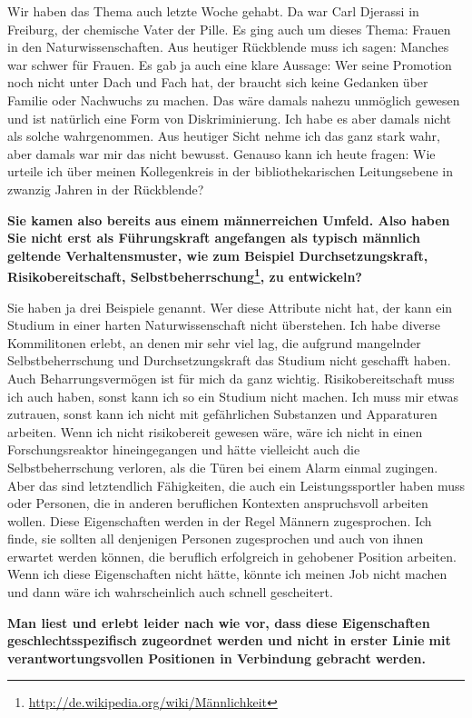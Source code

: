 \documentclass[a4paper,
fontsize=11pt,
oneside,
numbers=noperiodatend,
parskip=half-,
bibliography=totoc,
final
]{scrartcl}
\begin{document}
Wir haben das Thema auch letzte Woche gehabt. Da war Carl Djerassi in
Freiburg, der chemische Vater der Pille. Es ging auch um dieses Thema:
Frauen in den Naturwissenschaften. Aus heutiger Rückblende muss ich
sagen: Manches war schwer für Frauen. Es gab ja auch eine klare Aussage:
Wer seine Promotion noch nicht unter Dach und Fach hat, der braucht sich
keine Gedanken über Familie oder Nachwuchs zu machen. Das wäre damals
nahezu unmöglich gewesen und ist natürlich eine Form von
Diskriminierung. Ich habe es aber damals nicht als solche wahrgenommen.
Aus heutiger Sicht nehme ich das ganz stark wahr, aber damals war mir
das nicht bewusst. Genauso kann ich heute fragen: Wie urteile ich über
meinen Kollegenkreis in der bibliothekarischen Leitungsebene in zwanzig
Jahren in der Rückblende?

\textbf{Sie kamen also bereits aus einem männerreichen Umfeld. Also
haben Sie nicht erst als Füh\-rungs\-kraft angefangen als typisch männlich
geltende Verhaltensmuster, wie zum Beispiel Durchsetzungskraft,
Risikobereitschaft, Selbstbeherrschung\footnote{\href{http://de.wikipedia.org/wiki/M\%C3\%A4nnlichkeit}{http://de.wikipedia.org/wiki/Männlichkeit}},
zu entwickeln?}

Sie haben ja drei Beispiele genannt. Wer diese Attribute nicht hat, der
kann ein Studium in einer harten Naturwissenschaft nicht überstehen. Ich
habe diverse Kommilitonen erlebt, an denen mir sehr viel lag, die
aufgrund mangelnder Selbstbeherrschung und Durchsetzungskraft das
Studium nicht geschafft haben. Auch Beharrungsvermögen ist für mich da
ganz wichtig. Risikobereitschaft muss ich auch haben, sonst kann ich so
ein Studium nicht machen. Ich muss mir etwas zutrauen, sonst kann ich
nicht mit gefährlichen Substanzen und Apparaturen arbeiten. Wenn ich
nicht risikobereit gewesen wäre, wäre ich nicht in einen
Forschungsreaktor hineingegangen und hätte vielleicht auch die
Selbstbeherrschung verloren, als die Türen bei einem Alarm einmal
zugingen. Aber das sind letztendlich Fähigkeiten, die auch ein
Leistungssportler haben muss oder Personen, die in anderen beruflichen
Kontexten anspruchsvoll arbeiten wollen. Diese Eigenschaften werden in
der Regel Männern zugesprochen. Ich finde, sie sollten all denjenigen
Personen zugesprochen und auch von ihnen erwartet werden können, die
beruflich erfolgreich in gehobener Position arbeiten. Wenn ich diese
Eigenschaften nicht hätte, könnte ich meinen Job nicht machen und dann
wäre ich wahrscheinlich auch schnell gescheitert.

\textbf{Man liest und erlebt leider nach wie vor, dass diese
Eigenschaften geschlechtsspezifisch zugeordnet werden und nicht in
erster Linie mit verantwortungsvollen Positionen in Verbindung gebracht
werden.}
\end{document}
